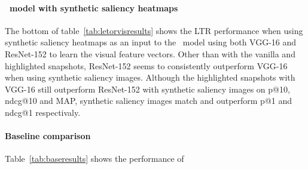 \paragraph{\modelname~model with synthetic saliency heatmaps}
The bottom of table~\ref{tab:letorvisresults} shows the \ac{LTR} performance when using synthetic saliency heatmaps as an input to the \modelname~model using both VGG-16 and ResNet-152 to learn the visual feature vectors. Other than with the vanilla and highlighted snapshots, ResNet-152 seems to consistently outperform VGG-16 when using synthetic saliency images. Although the highlighted snapshots with VGG-16 still outperform ResNet-152 with synthetic saliency images on p@10, ndcg@10 and MAP, synthetic saliency images match and outperform p@1 and ndcg@1 respectivaly. 


\paragraph{Baseline comparison}
Table~\ref{tab:baseresults} shows the performance of 

